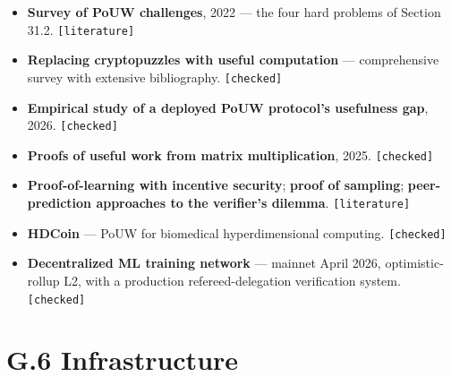 \documentclass[
  11pt]{report}
\providecommand{\tightlist}{%
  \setlength{\itemsep}{0pt}\setlength{\parskip}{0pt}}
\begin{document}
\begin{itemize}
\tightlist
\item
  \textbf{Survey of PoUW challenges}, 2022 --- the four hard problems of
  Section 31.2. \texttt{{[}literature{]}}
\item
  \textbf{Replacing cryptopuzzles with useful computation} ---
  comprehensive survey with extensive bibliography.
  \texttt{{[}checked{]}}
\item
  \textbf{Empirical study of a deployed PoUW protocol's usefulness gap},
  2026. \texttt{{[}checked{]}}
\item
  \textbf{Proofs of useful work from matrix multiplication}, 2025.
  \texttt{{[}checked{]}}
\item
  \textbf{Proof-of-learning with incentive security}; \textbf{proof of
  sampling}; \textbf{peer-prediction approaches to the verifier's
  dilemma}. \texttt{{[}literature{]}}
\item
  \textbf{HDCoin} --- PoUW for biomedical hyperdimensional computing.
  \texttt{{[}checked{]}}
\item
  \textbf{Decentralized ML training network} --- mainnet April 2026,
  optimistic-rollup L2, with a production refereed-delegation
  verification system. \texttt{{[}checked{]}}
\end{itemize}

\hypertarget{g.6-infrastructure}{%
\section{G.6 Infrastructure}\label{g.6-infrastructure}}
\end{document}
